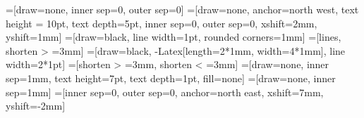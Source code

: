 \usepackage{amsmath,amssymb}
\usepackage[scaled]{helvet}
\renewcommand\familydefault{\sfdefault} 
\usepackage{sfmath}
\usetikzlibrary{shapes.geometric, arrows.meta, calc, decorations.pathmorphing}

\newcommand{\tinySize}{\tiny}			%
\newcommand{\textSize}{\scriptsize}		%
\newcommand{\headingSize}{\small}		%
\newcommand{\labelSize}{\large}			%

\newcommand{\figLabel}[1]{\labelSize\textbf{\MakeLowercase{#1}}}

\newcommand{\figHeading}[1]{\headingSize \MakeUppercase{#1}}

\newcommand{\RomanNumeralCaps}[1]{\MakeUppercase{\romannumeral #1}}


\newcommand{\unit}{1mm}
\newcommand{\arrow}{{Latex[length=2*\unit, width=4*\unit]}}
\newcommand{\lineWidth}{1pt}

=[draw=none, inner sep=0, outer sep=0]
=[draw=none, anchor=north west, text height = 10pt, text depth=5pt, inner sep=0, outer sep=0, xshift=2mm, yshift=1mm]
=[draw=black, line width=\lineWidth, rounded corners=1mm]
=[lines, shorten > =3mm]
=[draw=black, -\arrow, line width=2*\lineWidth]
=[shorten > =3mm, shorten < =3mm]
=[draw=none, inner sep=1mm, text height=7pt, text depth=1pt, fill=none]
=[draw=none, inner sep=1mm]
=[inner sep=0, outer sep=0, anchor=north east, xshift=7mm, yshift=-2mm]